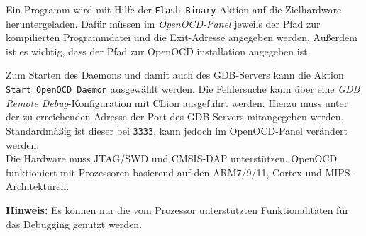     Ein Programm wird mit Hilfe der \texttt{Flash Binary}-Aktion auf die Zielhardware heruntergeladen.
    Dafür müssen im \textit{OpenOCD-Panel} jeweils der Pfad zur kompilierten Programmdatei und die Exit-Adresse
    angegeben werden. Außerdem ist es wichtig, dass der Pfad zur OpenOCD installation angegeben ist.

    Zum Starten des Daemons und damit auch des GDB-Servers kann die Aktion \texttt{Start OpenOCD Daemon}
    ausgewählt werden. Die Fehlersuche kann über eine \textit{GDB Remote Debug}-Konfiguration mit CLion ausgeführt
    werden. Hierzu muss unter der zu erreichenden Adresse der Port des GDB-Servers mitangegeben werden. Standardmäßig
    ist dieser bei \texttt{3333}, kann jedoch im OpenOCD-Panel verändert werden.
    \\

    Die Hardware muss JTAG/SWD und CMSIS-DAP unterstützen. OpenOCD funktioniert mit Prozessoren basierend auf den
    ARM7/9/11,-Cortex und MIPS-Architekturen.

    \textbf{Hinweis:} Es können nur die vom Prozessor unterstützten Funktionalitäten für das Debugging genutzt werden.
